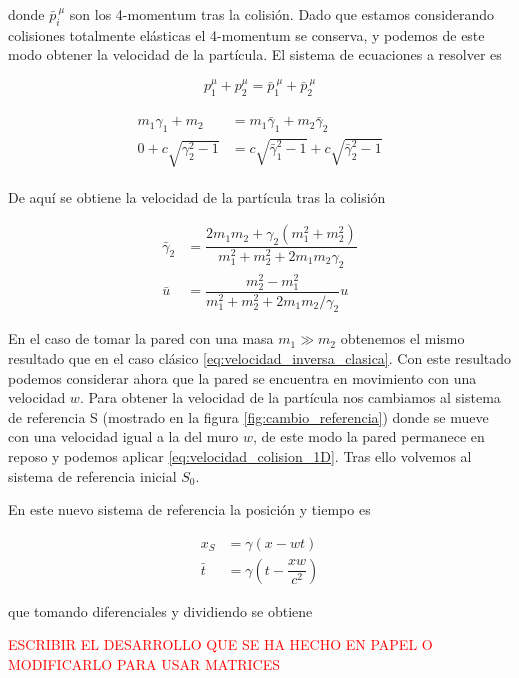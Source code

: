 \documentclass[11pt, spanish]{book}
\begin{document}
donde \( \bar{p}^{\:\mu}_i \) son los 4-momentum tras la colisión. Dado que estamos considerando colisiones totalmente elásticas el 4-momentum se conserva, y podemos de este modo obtener la velocidad de la partícula. El sistema de ecuaciones a resolver es

\begin{equation}
    p^\mu_1 + p^\mu_2 = \bar{p}^{\:\mu}_1 + \bar{p}^{\:\mu}_2
\end{equation}

\begin{align}
        \begin{split}
            m_1\gamma_1 + m_2 &= m_1\bar{\gamma}_1 + m_2\bar{\gamma}_2 \\
        0 + c\sqrt{\gamma^2_2 -1} &= c\sqrt{\bar{\gamma}^2_1 -1} + c\sqrt{\bar{\gamma}^2_2 -1}
        \end{split}
\end{align}

De aquí se obtiene la velocidad de la partícula tras la colisión

\begin{align}
    \bar{\gamma}_2 &= \dfrac{2 m_1 m_2 + \gamma_2(m_1^2 + m_2^2)}{m_1^2+m_2^2+2 m_1 m_2 \gamma_2} \\[3mm]
    \bar{u} &= \dfrac{m_2^2 - m_1^2}{m_1^2 + m_2^2 + 2 m_1 m_2 / \gamma_2}u
    \label{eq:velocidad_colision_1D}
\end{align}

En el caso de tomar la pared con una masa \( m_1 \gg m_2 \) obtenemos el mismo resultado que en el caso clásico \ref{eq:velocidad_inversa_clasica}. Con este resultado podemos considerar ahora que la pared se encuentra en movimiento con una velocidad \( w \). Para obtener la velocidad de la partícula nos cambiamos al sistema de referencia S (mostrado en la figura \ref{fig:cambio_referencia}) donde se mueve con una velocidad igual a la del muro \( w \), de este modo la pared permanece en reposo y podemos aplicar \ref{eq:velocidad_colision_1D}. Tras ello volvemos al sistema de referencia inicial \( S_0 \).

\vspace{3mm}

En este nuevo sistema de referencia la posición y tiempo es

\begin{align}
    x_S &= \gamma(x - wt) \\
    \bar{t} &= \gamma(t - \dfrac{xw}{c^2})
\end{align}

que tomando diferenciales y dividiendo se obtiene

\textcolor{red}{ESCRIBIR EL DESARROLLO QUE SE HA HECHO EN PAPEL O MODIFICARLO PARA USAR MATRICES}    




    
\end{document}
